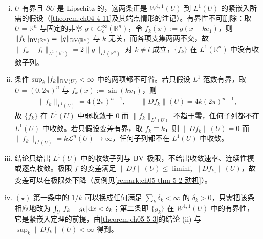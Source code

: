 \documentclass[../../main.tex]{subfiles}%
\begin{document}
\begin{remark}\label{remark:ch05-thm-5-5-条件}
\begin{enumerate}[(i)]
\item $U$ 有界且 $\partial U$ 是 Lipschitz 的，这两条正是 $W^{1,1}(U)$ 到 $L^1(U)$ 的紧嵌入所需的假设（\cref{theorem:ch04-4-11}及其端点情形的注记）。有界性不可删除：取 $U=\mathbb{R}^n$ 与固定的非零 $g\in C_c^{\infty}(\mathbb{R}^n)$，令 $f_k(x):=g(x-ke_1)$，则 $\lVert f_k\rVert_{\mathrm{BV}(\mathbb{R}^n)}=\lVert g\rVert_{\mathrm{BV}(\mathbb{R}^n)}$ 与 $k$ 无关，而各项支集两两不交，故 $\lVert f_k-f_l\rVert_{L^1(\mathbb{R}^n)}=2\lVert g\rVert_{L^1(\mathbb{R}^n)}$ 对 $k\neq l$ 成立，$\{f_k\}$ 在 $L^1(\mathbb{R}^n)$ 中没有收敛子列。%
\item 条件 $\sup_k\lVert f_k\rVert_{\mathrm{BV}(U)}<\infty$ 中的两项都不可省。若只假设 $L^1$ 范数有界，取 $U=(0,2\pi)^n$ 与 $f_k(x):=\sin(kx_1)$，则
\begin{align*}
\lVert f_k\rVert_{L^1(U)}=4(2\pi)^{n-1},\qquad \lVert Df_k\rVert(U)=4k(2\pi)^{n-1},
\end{align*}
故 $\{f_k\}$ 在 $L^1(U)$ 中弱收敛于 $0$ 而 $\lVert f_k\rVert_{L^1(U)}$ 不趋于零，任何子列都不在 $L^1(U)$ 中收敛。若只假设变差有界，取 $f_k\equiv k$，则 $\lVert Df_k\rVert(U)=0$ 而 $\lVert f_k\rVert_{L^1(U)}=k\mathcal{L}^n(U)\to\infty$，任何子列都不在 $L^1(U)$ 中收敛。
\item 结论只给出 $L^1(U)$ 中的收敛子列与 $\mathrm{BV}$ 极限，不给出收敛速率、连续性模或逐点收敛。极限 $f$ 的变差满足 $\lVert Df\rVert(U)\leqslant\liminf_j\lVert Df_{k_j}\rVert(U)$，故变差可以在极限处下降（反例见\cref{remark:ch05-thm-5-2-动机}）。%
\item $(\star)$ 第一条中的 $1/k$ 可以换成任何满足 $\sum_k\delta_k<\infty$ 的 $\delta_k>0$，只需把该条相应地改为 $\int_U\lvert f_k-g_k\rvert\mathrm{d} x<\delta_k$；第二条即 $\{g_k\}$ 在 $W^{1,1}(U)$ 中的有界性，它是紧嵌入定理的前提，由\cref{theorem:ch05-5-3}的结论 (ii) 与 $\sup_k\lVert Df_k\rVert(U)<\infty$ 得到。%
\end{enumerate}
\end{remark}
\end{document}
